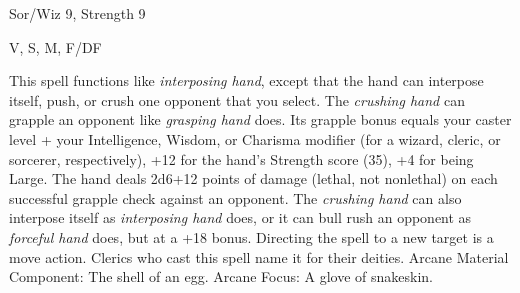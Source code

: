 
\begin{description*}
\item[Level:] Sor/Wiz 9, Strength 9
\item[Components:] V, S, M, F/DF
\end{description*}

This spell functions like \textit{interposing hand}, except that the hand can interpose
itself, push, or crush one opponent that you select.
The \textit{crushing hand} can grapple an opponent like \textit{grasping hand} does.
Its grapple bonus equals your caster level + your Intelligence, Wisdom, or Charisma
modifier (for a wizard, cleric, or sorcerer, respectively), +12 for the hand's
Strength score (35), +4 for being Large. The hand deals 2d6+12 points of damage
(lethal, not nonlethal) on each successful grapple check against an opponent.
The \textit{crushing hand} can also interpose itself as \textit{interposing hand
}does, or it can bull rush an opponent as \textit{forceful hand} does, but at a
+18 bonus.
Directing the spell to a new target is a move action.
Clerics who cast this spell name it for their deities.
Arcane Material Component: The shell of an egg.
Arcane Focus: A glove of snakeskin.